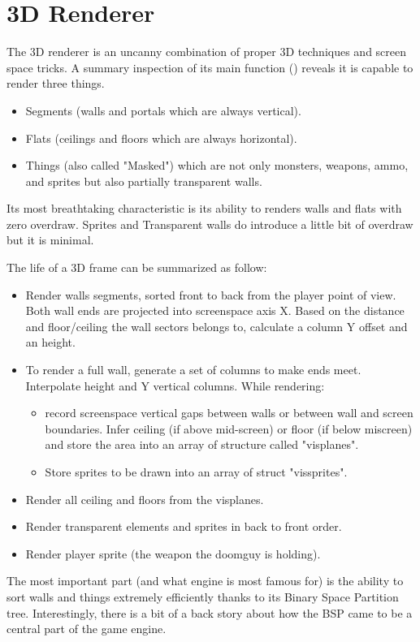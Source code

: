 \section{3D Renderer}
The 3D renderer is an uncanny combination of proper 3D techniques and screen space tricks. A summary inspection of its main function () reveals it is capable to render three things.\\
\par
{}
\par
\begin{itemize}
	\item Segments (walls and portals which are always vertical).
	\item Flats (ceilings and floors which are always horizontal).
	\item Things (also called "Masked") which are not only monsters, weapons, ammo, and sprites but also partially transparent walls.
\end{itemize}
 Its most breathtaking characteristic is its ability to renders walls and flats with zero overdraw. Sprites and Transparent walls do introduce a little bit of overdraw but it is minimal.\\
\par
The life of a 3D frame can be summarized as follow:
\begin{itemize}
\item Render walls segments, sorted front to back from the player point of view. Both wall ends are projected into screenspace axis X. Based on the distance and floor/ceiling the wall sectors belongs to, calculate a column Y offset and an height. 
\item To render a full wall, generate a set of columns to make ends meet. Interpolate height and Y vertical columns. While rendering:
   \begin{itemize}
     \item record screenspace vertical gaps between walls or between wall and screen boundaries. Infer ceiling (if above mid-screen) or floor (if below miscreen) and store the area into an array of structure called "visplanes".
     \item Store sprites to be drawn into an array of struct "vissprites".
   \end{itemize}      
\item Render all ceiling and floors from the visplanes.
\item Render transparent elements and sprites in back to front order.
\item Render player sprite (the weapon the doomguy is holding).
\end{itemize}
\par
The most important part (and what \doom{} engine is most famous for) is the ability to sort walls and things extremely efficiently thanks to its Binary Space Partition tree. Interestingly, there is a bit of a back story about how the BSP came to be a central part of the game engine.\\
\par
\pagebreak



